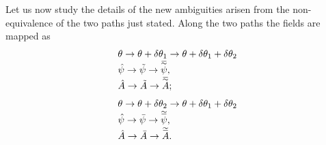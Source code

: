 \documentclass[a4paper,a4paper]{article}%
\begin{document}
Let us now study the details of the new ambiguities arisen from the
non-equivalence of the two paths just stated. Along the two paths the fields
are mapped as%
\[%
\begin{array}
[c]{l}%
\theta\rightarrow\theta+\delta\theta_{1}\rightarrow\theta+\delta\theta
_{1}+\delta\theta_{2}\\
\hat{\psi}\rightarrow\tilde{\psi}\rightarrow\overset{\eqsim}{\psi},\\
\hat{A}\rightarrow\tilde{A}\rightarrow\overset{\eqsim}{A};
\end{array}
\]%
\[%
\begin{array}
[c]{l}%
\theta\rightarrow\theta+\delta\theta_{2}\rightarrow\theta+\delta\theta
_{1}+\delta\theta_{2}\\
\hat{\psi}\rightarrow\bar{\psi}\rightarrow\overset{\simeq}{\psi},\\
\hat{A}\rightarrow\bar{A}\rightarrow\overset{\simeq}{A}.
\end{array}
\]
\end{document}
